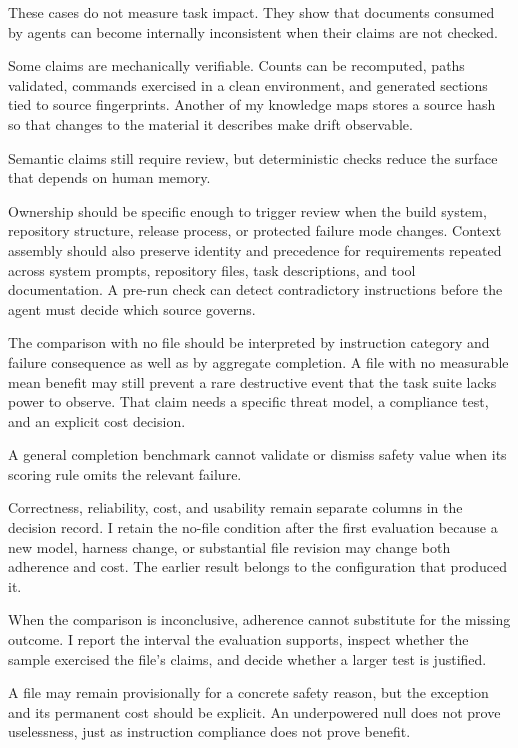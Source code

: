 These cases do not measure task impact. They show that documents consumed by agents can become internally inconsistent when their claims are not checked.

Some claims are mechanically verifiable. Counts can be recomputed, paths validated, commands exercised in a clean environment, and generated sections tied to source fingerprints. Another of my knowledge maps stores a source hash so that changes to the material it describes make drift observable.

Semantic claims still require review, but deterministic checks reduce the surface that depends on human memory.

Ownership should be specific enough to trigger review when the build system, repository structure, release process, or protected failure mode changes. Context assembly should also preserve identity and precedence for requirements repeated across system prompts, repository files, task descriptions, and tool documentation. A pre-run check can detect contradictory instructions before the agent must decide which source governs.

The comparison with no file should be interpreted by instruction category and failure consequence as well as by aggregate completion. A file with no measurable mean benefit may still prevent a rare destructive event that the task suite lacks power to observe. That claim needs a specific threat model, a compliance test, and an explicit cost decision.

A general completion benchmark cannot validate or dismiss safety value when its scoring rule omits the relevant failure.

Correctness, reliability, cost, and usability remain separate columns in the decision record. I retain the no-file condition after the first evaluation because a new model, harness change, or substantial file revision may change both adherence and cost. The earlier result belongs to the configuration that produced it.

When the comparison is inconclusive, adherence cannot substitute for the missing outcome. I report the interval the evaluation supports, inspect whether the sample exercised the file's claims, and decide whether a larger test is justified.

A file may remain provisionally for a concrete safety reason, but the exception and its permanent cost should be explicit. An underpowered null does not prove uselessness, just as instruction compliance does not prove benefit.

